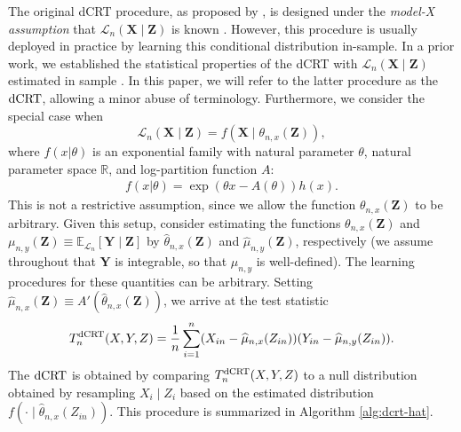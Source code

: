 \documentclass[12pt]{article}
\theoremstyle{definition}
\newcommand{\E}{\mathbb E}								%
\newcommand{\R}{\mathbb{R}}								%
\newcommand{\prx}{\bm X}								%
\newcommand{\srx}{X}									%
\newcommand{\prz}{\bm Z}								%
\newcommand{\srz}{Z}									%
\newcommand{\pry}{{\bm Y}}								%
\newcommand{\sry}{Y}									%
\newcommand{\law}{\mathcal L}							%
\newcommand{\dCRT}{\textnormal{dCRT}} 					%
\begin{document}
The original dCRT procedure, as proposed by \citet{Liu2022a}, is designed under the \textit{model-X assumption} that $\law_n(\prx \mid \prz)$ is known \citep{CetL16}. However, this procedure is usually deployed in practice by learning this conditional distribution in-sample. In a prior work, we established the statistical properties of the dCRT with $\law_n(\prx \mid \prz)$ estimated in sample \citep{Niu2022a}. In this paper, we will refer to the latter procedure as the $\dCRT$, allowing a minor abuse of terminology. Furthermore, we consider the special case when 
\begin{equation}
\law_n(\prx \mid \prz) = f(\prx \mid \theta_{n,x}(\prz)), 
\end{equation}
where $f(x|\theta)$ is an exponential family with natural parameter $\theta$, natural parameter space $\R$, and log-partition function $A$:
\begin{align*}
f(x|\theta)=\exp(\theta x -A(\theta))h(x).
\end{align*}
This is not a restrictive assumption, since we allow the function $\theta_{n,x}(\prz)$ to be arbitrary. Given this setup, consider estimating the functions $\theta_{n,x}(\prz)$ and $\mu_{n,y}(\prz) \equiv \E_{\law_n}[\pry \mid \prz]$ by $\widehat{\theta}_{n,x}(\prz)$ and $\widehat \mu_{n,y}(\prz)$, respectively (we assume throughout that $\pry$ is integrable, so that $\mu_{n,y}$ is well-defined). The learning procedures for these quantities can be arbitrary. Setting $\widehat \mu_{n,x}(\prz) \equiv A'(\widehat{\theta}_{n,x}(\prz))$, we arrive at the test statistic 
\begin{align}\label{eq:dCRThat}
	T_n^{\dCRT}(X,Y,Z)
  =\frac{1}{n}\sum_{i=1}^{n}(\srx_{in}-\widehat\mu_{n,x}(\srz_{in}))(\sry_{in}-\widehat{\mu}_{n,y}(\srz_{in})).
\end{align}
The $\dCRT$ is obtained by comparing $T_n^{\dCRT}(\srx, \sry, \srz)$ to a null distribution obtained by resampling $\srx_i \mid \srz_i$ based on the estimated distribution $f(\cdot \mid \widehat \theta_{n,x}(Z_{in})).$ This procedure is summarized in Algorithm \ref{alg:dcrt-hat}.
\end{document}
